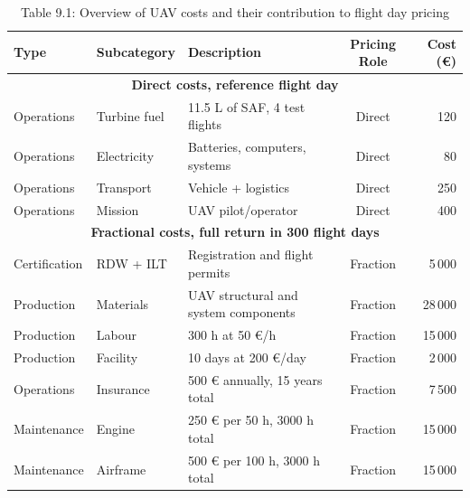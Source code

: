 \begin{table}[H]
    \centering
    \caption*{Table 9.1: Overview of UAV costs and their contribution to flight day pricing}
    
    \begin{tabular}{|l|l|l|c|r|}
        \hline
        \textbf{Type} & \textbf{Subcategory} & \textbf{Description} & \textbf{Pricing Role} & \textbf{Cost (€)} \\ \hline \hline
        
        \multicolumn{5}{|c|}{\textbf{Direct costs, reference flight day}} \\ \hline
        Operations & Turbine fuel & 11.5 L of SAF, 4 test flights & Direct & 120 \\ \hline
        Operations & Electricity & Batteries, computers, systems & Direct & 80 \\ \hline
        Operations & Transport & Vehicle + logistics & Direct & 250 \\ \hline
        Operations & Mission & UAV pilot/operator & Direct & 400 \\ \hline
        
        \multicolumn{5}{|c|}{\textbf{Fractional costs, full return in 300 flight days}} \\ \hline
        Certification & RDW + ILT & Registration and flight permits & Fraction & 5\,000 \\ \hline
        
        Production & Materials & UAV structural and system components & Fraction & 28\,000 \\ \hline
        Production & Labour & 300 h at 50 €/h & Fraction & 15\,000 \\ \hline
        Production & Facility & 10 days at 200 €/day & Fraction & 2\,000 \\ \hline
        
        Operations & Insurance & 500 € annually, 15 years total & Fraction & 7\,500 \\ \hline
        
        Maintenance & Engine & 250 € per 50 h, 3000 h total & Fraction & 15\,000 \\ \hline
        Maintenance & Airframe & 500 € per 100 h, 3000 h total & Fraction & 15\,000 \\ \hline
        
    \end{tabular}
    \label{tab:Overview-Cost-Table}
\end{table}

